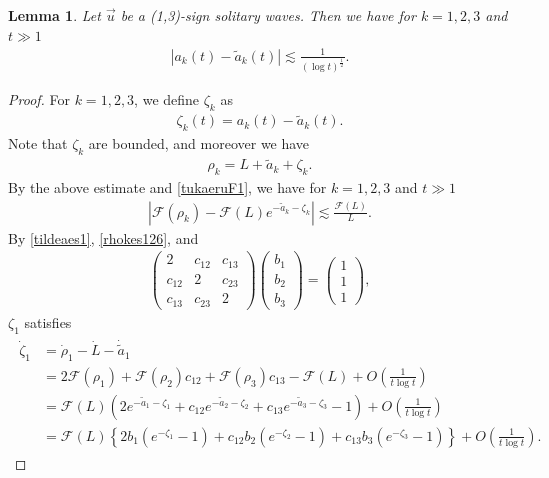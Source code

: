 \documentclass[reqno]{amsart}
\theoremstyle{plain}
\newtheorem{lemma}[theorem]{Lemma}
\theoremstyle{definition}
\numberwithin{equation}{section}
\newcommand{\1}{\mathbbm{1}}
\begin{document}
\begin{lemma}\label{aklemma}
Let $\vec{u}$ be a (1,3)-sign solitary waves. Then we have for $k=1,2,3$ and $t\gg 1$
\begin{align}\label{aes2}
\left|a_k(t)-\tilde{a}_k(t)\right|\lesssim \frac{1}{(\log{t})^{\frac{1}{2}}}.
\end{align}
\end{lemma}
\begin{proof}
For $k=1,2,3$, we define $\zeta_k$ as
\begin{align}\label{zetadef}
\zeta_k(t)=a_k(t)-\tilde{a}_k(t).
\end{align}
Note that $\zeta_k$ are bounded, and moreover we have
\begin{align*}
\rho_k=L+\tilde{a}_k+\zeta_k.
\end{align*}
By the above estimate and \eqref{tukaeruF1}, we have for $k=1,2,3$ and $t\gg 1$
\begin{align}\label{rhokes126}
\left|\mathcal{F}(\rho_k)-\mathcal{F}(L)e^{-\tilde{a}_k-\zeta_k}\right|\lesssim \frac{\mathcal{F}(L)}{L}.
\end{align}
By \eqref{tildeaes1}, \eqref{rhokes126}, and
\begin{align*}
\begin{pmatrix}
2&c_{12}&c_{13}
\\
c_{12}&2&c_{23}
\\
c_{13}&c_{23}&2
\end{pmatrix}
\begin{pmatrix}
b_1
\\
b_2
\\
b_3
\end{pmatrix}
=
\begin{pmatrix}
1
\\
1
\\
1
\end{pmatrix}
,
\end{align*}
$\zeta_1$ satisfies
\begin{align}\label{zeta1es}
\begin{aligned}
\dot{\zeta}_1&=\dot{\rho}_1-\dot{L}-\dot{\tilde{a}}_1
\\
&=2\mathcal{F}(\rho_1)+\mathcal{F}(\rho_2)c_{12}+\mathcal{F}(\rho_3)c_{13}-\mathcal{F}(L)+O\left(\frac{1}{t\log{t}}\right)
\\
&=\mathcal{F}(L)\left(2e^{-\tilde{a}_1-\zeta_1}+c_{12}e^{-\tilde{a}_2-\zeta_2}+c_{13}e^{-\tilde{a}_3-\zeta_3}-1\right)+O\left(\frac{1}{t\log{t}}\right)
\\
&=\mathcal{F}(L)\left\{2b_1(e^{-\zeta_1}-1)+c_{12}b_2(e^{-\zeta_2}-1)+c_{13}b_3(e^{-\zeta_3}-1)\right\}+O\left(\frac{1}{t\log{t}}\right).

\end{aligned}
\end{align}
\end{proof}
\end{document}
